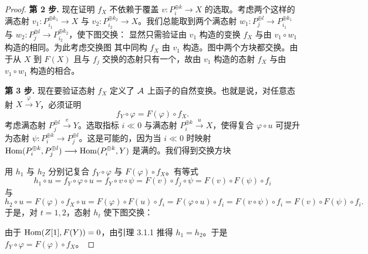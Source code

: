 \begin{proof}
\textbf{第 2 步.} 现在证明 $f_X$ 不依赖于覆盖 $v:P_i^{\oplus k}\longrightarrow X$ 的选取。考虑两个这样的满态射 $v_1:P_{i_1}^{\oplus k_1}\longrightarrow X$ 与 $v_2:P_{i_2}^{\oplus k_2}\longrightarrow X$。我们总能取到两个满态射 $w_1:P_j^{\oplus l}\longrightarrow P_{i_1}^{\oplus k_1}$ 与 $w_2:P_j^{\oplus l}\longrightarrow P_{i_2}^{\oplus k_2}$，使下图交换：
显然只需验证由 $v_1$ 构造的变换 $f_X$ 与由 $v_1\circ w_1$ 构造的相同。为此考虑交换图
其中同构 $f_X$ 由 $v_1$ 构造。图中两个方块都交换。由于从 $X$ 到 $F(X)$ 且与 $f_j$ 交换的态射只有一个，故由 $v_1$ 构造的态射 $f_X$ 与由 $v_1\circ w_1$ 构造的相合。

\textbf{第 3 步.} 现在要验证态射 $f_X$ 定义了 $\mathcal{A}$ 上函子的自然变换。也就是说，对任意态射 $X\xrightarrow{\ \varphi\ }Y$，必须证明
\begin{equation*}
f_Y\circ\varphi=F(\varphi)\circ f_X.
\end{equation*}
考虑满态射 $P_j^{\oplus l}\xrightarrow{\ v\ }Y$。选取指标 $i\ll 0$ 与满态射 $P_i^{\oplus k}\xrightarrow{\ u\ }X$，使得复合 $\varphi\circ u$ 可提升为态射 $\psi:P_i^{\oplus k}\longrightarrow P_j^{\oplus l}$。这是可能的，因为当 $i\ll 0$ 时映射 $\operatorname{Hom}(P_i^{\oplus k},P_j^{\oplus l})\longrightarrow\operatorname{Hom}(P_i^{\oplus k},Y)$ 是满的。我们得到交换方块

用 $h_1$ 与 $h_2$ 分别记复合 $f_Y\circ\varphi$ 与 $F(\varphi)\circ f_X$。有等式
\begin{equation*}
h_1\circ u=f_Y\circ\varphi\circ u=f_Y\circ v\circ\psi=F(v)\circ f_j\circ\psi=F(v)\circ F(\psi)\circ f_i
\end{equation*}
与
\begin{equation*}
h_2\circ u=F(\varphi)\circ f_X\circ u=F(\varphi)\circ F(u)\circ f_i=F(\varphi\circ u)\circ f_i=F(v\circ\psi)\circ f_i=F(v)\circ F(\psi)\circ f_i.
\end{equation*}
于是，对 $t=1,2$，态射 $h_t$ 使下图交换：
\begin{center}
\end{center}
由于 $\operatorname{Hom}(Z[1],F(Y))=0$，由引理 3.1.1 推得 $h_1=h_2$。于是 $f_Y\circ\varphi=F(\varphi)\circ f_X$。


\end{proof}

